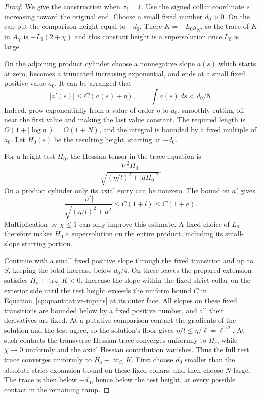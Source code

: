 \begin{proof}
We give the construction when $\sigma_i=1$.  Use the signed collar
coordinate $s$ increasing toward the original end.  Choose a small
fixed number $d_0>0$.  On the cap put the comparison height equal to
$-d_0$.  There $K=-L_0g_N$, so the trace of $K$ in $A_\chi$ is
$-L_0(2+\chi)$ and this constant height is a supersolution once
$L_0$ is large.

On the adjoining product cylinder choose a nonnegative slope $a(s)$
which starts at zero, becomes a truncated increasing exponential, and
ends at a small fixed positive value $a_0$.  It can be arranged that
\[
  |a'(s)|\le C(a(s)+\eta),\qquad
  \int a(s)\,ds<d_0/8.
\]
Indeed, grow exponentially from a value of order $\eta$ to $a_0$,
smoothly cutting off near the first value and making the last value
constant.  The required length is
$O(1+|\log\eta|)=O(1+N)$, and the integral is bounded by a fixed
multiple of $a_0$.  Let $H_0(s)$ be the resulting height, starting at
$-d_0$.

For a height test $H_0$, the Hessian tensor in the trace equation is
\[
 \frac{\nabla^2H_0}
      {\sqrt{(\eta/l)^2+|dH_0|^2}}.
\]
On a product cylinder only its axial entry can be nonzero.  The bound
on $a'$ gives
\[
 \frac{|a'|}{\sqrt{(\eta/l)^2+a^2}}
 \le C(1+l)\le C(1+e).
\]
Multiplication by $\chi\le1$ can only improve this estimate.  A fixed
choice of $L_0$ therefore makes $H_0$ a supersolution on the entire
product, including its small-slope starting portion.

Continue with a small fixed positive slope through the fixed
transition and up to $S$, keeping the total increase below $d_0/4$.
On these leaves the prepared extension satisfies
$H_s+\operatorname{tr}_{S_s}K<0$.  Increase the slope within the fixed
strict collar on the exterior side until the test height exceeds the
uniform bound $C$ in Equation~\eqref{cp:quantitative-inputs} at its
outer face.  All slopes on these fixed transitions are bounded below
by a fixed positive number, and all their derivatives are fixed.
At a putative comparison contact the gradients of the solution and
the test agree, so the solution's floor gives
$\eta/l\le\eta/\ell=\ell^{1/2}$.  At such contacts the transverse
Hessian trace converges uniformly to $H_s$, while $\chi\to0$
uniformly and the axial Hessian contribution vanishes.  Thus the
full test trace converges uniformly to
$H_s+\operatorname{tr}_{S_s}K$.  First choose
$d_0$ smaller than the absolute strict expansion bound on these
fixed collars, and then choose $N$ large.  The trace is then below
$-d_0$, hence below the test height, at every possible contact in the
remaining ramp.


\end{proof}
